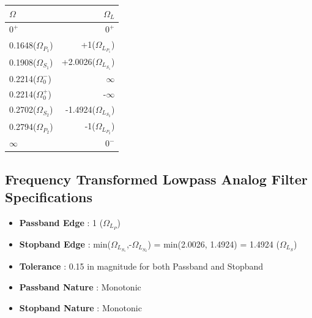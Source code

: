 \documentclass[12pt]{article}
\begin{document}
\begin{table}[h!]
\centering
\begin{tabular}{|l|r|}\hline

$\Omega$ & $\Omega_{L}$ \\\hline
$0^{+}$ & $0^{+}$  \\
0.1648($\Omega _{P_{1}}$)& +1($\Omega _{L_{P_{1}}}$) \\
0.1908($\Omega _{S_{1}}$)& +2.0026($\Omega _{L_{S_{1}}}$) \\
0.2214($\Omega _{0}^{-}$) & $\infty$\\
0.2214($\Omega _{0}^{+}$) & -$\infty$\\
0.2702($\Omega _{S_{2}}$) & -1.4924($\Omega _{L_{S_{2}}}$) \\
0.2794($\Omega _{P_{2}}$)& -1($\Omega _{L_{P_{2}}}$) \\
$\infty$ & $0^{-}$ \\\hline
\end{tabular}
\end{table}
\subsection{Frequency Transformed Lowpass Analog Filter Specifications}
\begin{itemize}
\item \textbf{Passband Edge} : 1 ($\Omega _{L_{P}}$)  
\item \textbf{Stopband Edge} : min($\Omega _{L_{S_{1}}}$,-$\Omega _{L_{S_{2}}}$) = min(2.0026, 1.4924) = 1.4924 ($\Omega _{L_{S}}$)
\item \textbf{Tolerance} : 0.15 in magnitude for both Passband and Stopband
\item \textbf{Passband Nature} : Monotonic
\item \textbf{Stopband Nature} : Monotonic
\end{itemize}
\end{document}
